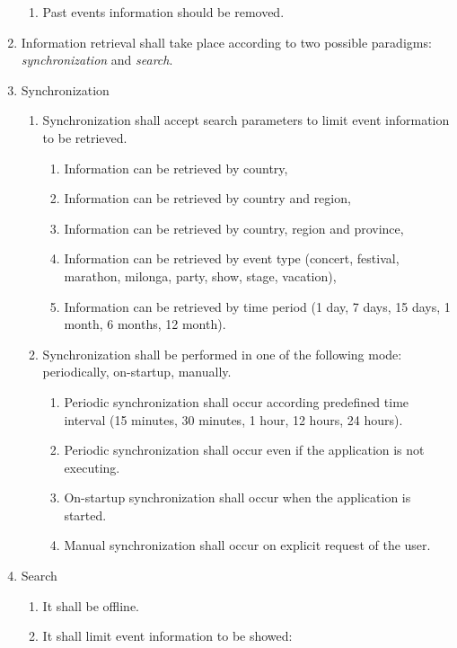\documentclass[12pt, twoside]{article}
\begin{document}
\begin{enumerate}
\begin{enumerate}
	        		\item Past events information should be removed.
    		\end{enumerate}
    	\item Information retrieval shall take place according to two possible 
          	paradigms: \emph{synchronization} and \emph{search}.
    	\item Synchronization
    		\begin{enumerate}
        			\item Synchronization shall accept search parameters to limit event information to be retrieved.
        				\begin{enumerate}
            				\item Information can be retrieved by country,
					\item	Information can be retrieved by country and region,
					\item	Information can be retrieved by country, region and province,
					\item	Information can be retrieved by event type (concert, festival, marathon, milonga, party, show, stage, vacation),
					\item	Information can be retrieved by time period (1 day, 7 days, 15 days, 1 month, 6 months, 12 month).
        				\end{enumerate}
        			\item Synchronization shall be performed in one of the following mode:
              			periodically, on-startup, manually.
				\begin{enumerate}
					\item Periodic synchronization shall occur according 
						predefined time interval (15 minutes, 30 minutes, 1 hour, 12 hours, 24 hours).
					\item Periodic synchronization shall occur even if the application is not executing.
            				\item On-startup synchronization shall occur when the application is started.
					\item Manual synchronization shall occur on explicit request of the user.
				\end{enumerate}
		\end{enumerate}
	\item Search
    		\begin{enumerate}
        			\item It shall be offline.
			\item It shall limit event information to be showed:

\end{enumerate}
\end{enumerate}
\end{document}
